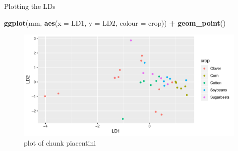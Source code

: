 \documentclass[ignorenonframetext,]{beamer}
\newenvironment{Shaded}{\begin{snugshade}}{\end{snugshade}}
\newcommand{\DataTypeTok}[1]{\textcolor[rgb]{0.13,0.29,0.53}{#1}}
\newcommand{\KeywordTok}[1]{\textcolor[rgb]{0.13,0.29,0.53}{\textbf{#1}}}
\newcommand{\NormalTok}[1]{#1}
\newcommand{\OperatorTok}[1]{\textcolor[rgb]{0.81,0.36,0.00}{\textbf{#1}}}
\newcommand{\StringTok}[1]{\textcolor[rgb]{0.31,0.60,0.02}{#1}}
\begin{document}
\begin{frame}[fragile]{Plotting the LDs}
\protect\hypertarget{plotting-the-lds}{}

\begin{Shaded}
\begin{Highlighting}[]
\KeywordTok{ggplot}\NormalTok{(mm, }\KeywordTok{aes}\NormalTok{(}\DataTypeTok{x =}\NormalTok{ LD1, }\DataTypeTok{y =}\NormalTok{ LD2, }\DataTypeTok{colour =}\NormalTok{ crop)) }\OperatorTok{+}
\StringTok{  }\KeywordTok{geom_point}\NormalTok{()}
\end{Highlighting}
\end{Shaded}

\begin{figure}
\centering
\includegraphics{figure/piacentini-1.pdf}
\caption{plot of chunk piacentini}
\end{figure}

\end{frame}
\end{document}

